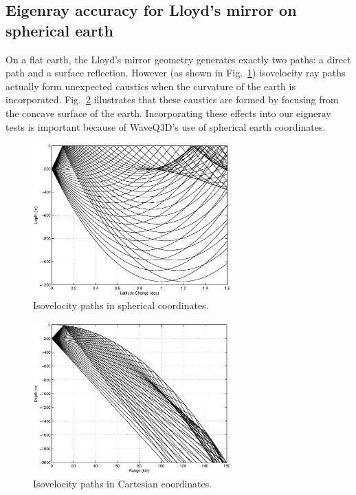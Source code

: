 \documentclass{ws-jca}
\begin{document}
\subsection{Eigenray accuracy for Lloyd's mirror on spherical earth} 

On a flat earth, the Lloyd's mirror geometry generates exactly two paths: a
direct path and a surface reflection. However (as shown in
Fig.~\ref{fig:eigenray_concave_rays1}) isovelocity ray paths actually form
unexpected caustics when the curvature of the earth is incorporated.
Fig.~\ref{fig:eigenray_concave_rays2} illustrates that these caustics are
formed by focusing from the concave surface of the earth. Incorporating
these effects into our eigneray tests is important because of WaveQ3D's use
of spherical earth coordinates.
\begin{figure}[th]
	\centerline{\includegraphics[width=3in]{eigenray_concave_rays1.eps}} 
	\vspace*{8pt}
	\caption{Isovelocity paths in spherical coordinates. 
	\label{fig:eigenray_concave_rays1}}
\end{figure}
\begin{figure}[th]
	\centerline{\includegraphics[width=3in]{eigenray_concave_rays2.eps}} 
	\vspace*{8pt}
	\caption{Isovelocity paths in Cartesian coordinates. 
	\label{fig:eigenray_concave_rays2}}
\end{figure}
\end{document}
